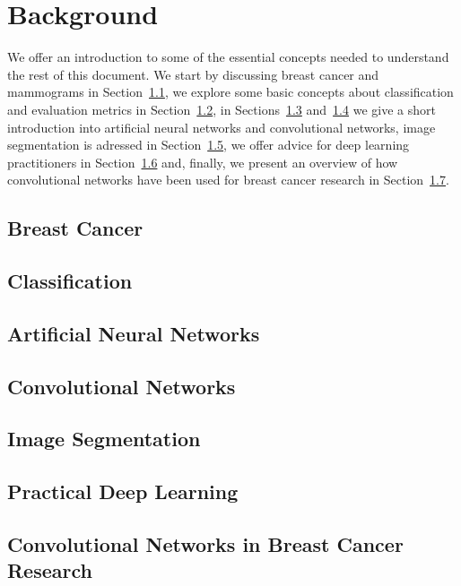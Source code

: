 \chapter{Background}
\label{ch:Background}
We offer an introduction to some of the essential concepts needed to understand the rest of this document. We start by discussing breast cancer and mammograms in Section~\ref{sec:BreastCancer}, we explore some basic concepts about classification and evaluation metrics in Section~\ref{sec:Classification}, in Sections~\ref{sec:ANNs} and~\ref{sec:ConvNets} we give a short introduction into artificial neural networks and convolutional networks, image segmentation is adressed in Section~\ref{sec:Segmentation}, we offer advice for deep learning practitioners in Section~\ref{sec:PracticalDL} and, finally, we present an overview of how convolutional networks have been used for breast cancer research in Section~\ref{sec:BreastCancerConvNets}.

\section{Breast Cancer}
\label{sec:BreastCancer}


\section{Classification}
\label{sec:Classification}


\section{Artificial Neural Networks}
\label{sec:ANNs}


\section{Convolutional Networks}
\label{sec:ConvNets}


\section{Image Segmentation}
\label{sec:Segmentation}
 

\section{Practical Deep Learning}
\label{sec:PracticalDL}


\section{Convolutional Networks in Breast Cancer Research}
\label{sec:BreastCancerConvNets}

